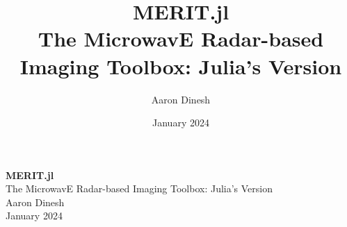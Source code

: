\documentclass{article}
\title{
    \textbf{MERIT.jl}\\
    \vspace{1mm}
    {The MicrowavE Radar-based Imaging Toolbox: Julia’s Version}
}
\author{Aaron Dinesh}
\date{January 2024}
\begin{document}
    \begin{titlepage}
        \vspace*{\fill}
        \begin{center}
          {\Huge \textbf{MERIT.jl}}\\[0.5cm]
          {\Large The MicrowavE Radar-based Imaging Toolbox: Julia’s Version}\\[0.4cm]
          {\Large Aaron Dinesh}\\[0.3cm]
          January 2024
        \end{center}
        \vspace*{\fill}
    \end{titlepage}
    
    
    
    \pagebreak
    
    
    
\end{document}
